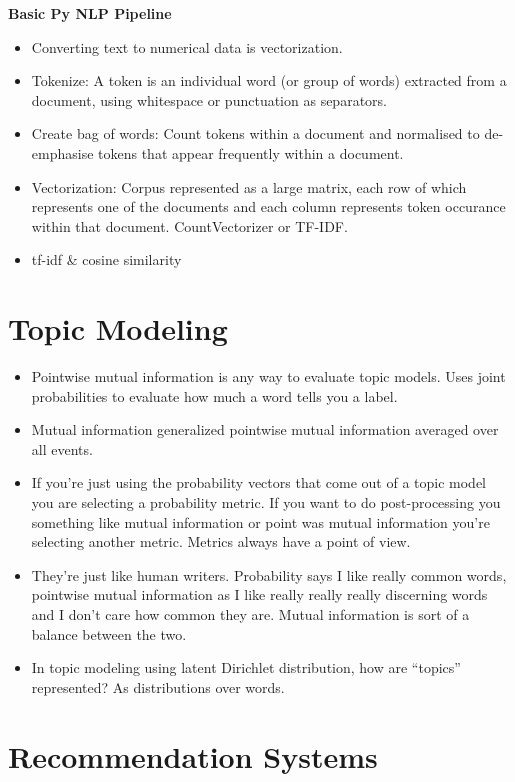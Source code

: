 \documentclass[]{book}
\theoremstyle{definition}
\theoremstyle{definition}
\theoremstyle{definition}
\theoremstyle{remark}
\begin{document}
\textbf{Basic Py NLP Pipeline}

\begin{itemize}
\item
  Converting text to numerical data is vectorization.
\item
  Tokenize: A token is an individual word (or group of words) extracted
  from a document, using whitespace or punctuation as separators.
\item
  Create bag of words: Count tokens within a document and normalised to
  de-emphasise tokens that appear frequently within a document.
\item
  Vectorization: Corpus represented as a large matrix, each row of which
  represents one of the documents and each column represents token
  occurance within that document. CountVectorizer or TF-IDF.
\item
  tf-idf \& cosine similarity
\end{itemize}

\section{Topic Modeling}\label{topic-modeling}

\begin{itemize}
\item
  Pointwise mutual information is any way to evaluate topic models. Uses
  joint probabilities to evaluate how much a word tells you a label.
\item
  Mutual information generalized pointwise mutual information averaged
  over all events.
\item
  If you're just using the probability vectors that come out of a topic
  model you are selecting a probability metric. If you want to do
  post-processing you something like mutual information or point was
  mutual information you're selecting another metric. Metrics always
  have a point of view.
\item
  They're just like human writers. Probability says I like really common
  words, pointwise mutual information as I like really really really
  discerning words and I don't care how common they are. Mutual
  information is sort of a balance between the two.
\item
  In topic modeling using latent Dirichlet distribution, how are
  ``topics'' represented? As distributions over words.
\end{itemize}

\section{Recommendation Systems}\label{recommendation-systems}
\end{document}
